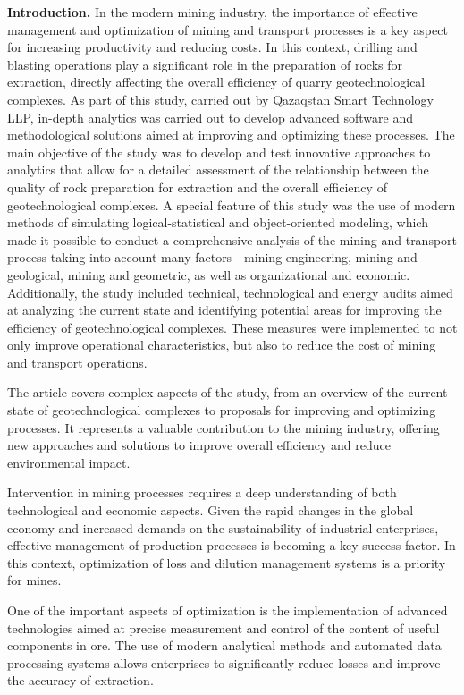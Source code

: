 \begin{multicols}{2}
{\bfseries Introduction.} In the modern mining industry, the importance of
effective management and optimization of mining and transport processes
is a key aspect for increasing productivity and reducing costs. In this
context, drilling and blasting operations play a significant role in the
preparation of rocks for extraction, directly affecting the overall
efficiency of quarry geotechnological complexes. As part of this study,
carried out by Qazaqstan Smart Technology LLP, in-depth analytics was
carried out to develop advanced software and methodological solutions
aimed at improving and optimizing these processes. The main objective of
the study was to develop and test innovative approaches to analytics
that allow for a detailed assessment of the relationship between the
quality of rock preparation for extraction and the overall efficiency of
geotechnological complexes. A special feature of this study was the use
of modern methods of simulating logical-statistical and object-oriented
modeling, which made it possible to conduct a comprehensive analysis of
the mining and transport process taking into account many factors -
mining engineering, mining and geological, mining and geometric, as well
as organizational and economic. Additionally, the study included
technical, technological and energy audits aimed at analyzing the
current state and identifying potential areas for improving the
efficiency of geotechnological complexes. These measures were
implemented to not only improve operational characteristics, but also to
reduce the cost of mining and transport operations.

The article covers complex aspects of the study, from an overview of the
current state of geotechnological complexes to proposals for improving
and optimizing processes. It represents a valuable contribution to the
mining industry, offering new approaches and solutions to improve
overall efficiency and reduce environmental impact.

Intervention in mining processes requires a deep understanding of both
technological and economic aspects. Given the rapid changes in the
global economy and increased demands on the sustainability of industrial
enterprises, effective management of production processes is becoming a
key success factor. In this context, optimization of loss and dilution
management systems is a priority for mines.

One of the important aspects of optimization is the implementation of
advanced technologies aimed at precise measurement and control of the
content of useful components in ore. The use of modern analytical
methods and automated data processing systems allows enterprises to
significantly reduce losses and improve the accuracy of extraction.


\end{multicols}
